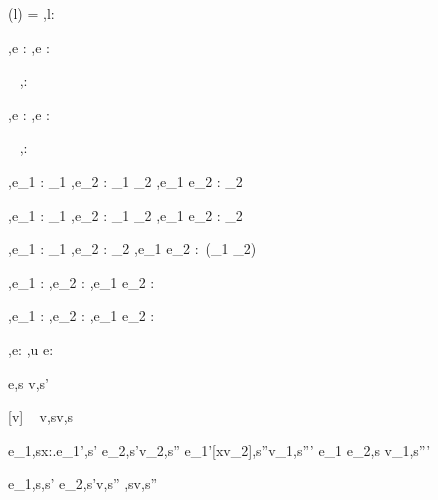  {\Sigma(l) = \tau}
  {\Gamma,\Sigma\infers l:\Reference \tau}


  {\Gamma,\Sigma \infers e : \tau}
  {\Gamma,\Sigma \infers \Edit e : \Task \tau}

  {\ }
  {\Gamma,\Sigma \infers \Enter \tau : \Task \tau}

  {\Gamma,\Sigma \infers e : \Reference \tau}
  {\Gamma,\Sigma \infers \Update e : \Task \tau}


  {\ }
  {\Gamma,\Sigma \infers \Fail : \Task \tau}


  {
    {\Gamma,\Sigma \infers e_1 : \Task \tau_1}
    {\Gamma,\Sigma \infers e_2 : \tau_1 \to \Task \tau_2}}
  {\Gamma,\Sigma \infers e_1 \Then e_2 : \Task \tau_2}


  {
    {\Gamma,\Sigma \infers e_1 : \Task \tau_1}
    {\Gamma,\Sigma \infers e_2 : \tau_1 \to \Task \tau_2}}
  {\Gamma,\Sigma \infers e_1 \Next e_2 : \Task \tau_2}


  {\Gamma,\Sigma \infers e_1 : \Task \tau_1  \Quad
   \Gamma,\Sigma \infers e_2 : \Task \tau_2}
  {\Gamma,\Sigma \infers e_1 \And e_2 : \Task\,(\tau_1 \times \tau_2)}


  {
    {\Gamma,\Sigma \infers e_1 : \Task \tau}
    {\Gamma,\Sigma \infers e_2 : \Task \tau}}
  {\Gamma,\Sigma \infers e_1 \Or e_2 : \Task \tau}


  {
    {\Gamma,\Sigma \infers e_1 : \Task \tau}
    {\Gamma,\Sigma \infers e_2 : \Task \tau}}
  {\Gamma,\Sigma \infers e_1 \Xor e_2 : \Task \tau}


  {\Gamma,\Sigma\infers e:\Task\tau}
  {\Gamma,\Sigma\infers u \At e:\Task\tau}





  {e,s \evaluate v,s'}


[v\in{}]
  {\ }
  {v,s\evaluate v,s}

  {e_1,s\evaluate \lambda x:\tau.e_1',s' \Quad
   e_2,s'\evaluate v_2,s'' \Quad
   e_1'[x\mapsto v_2],s''\evaluate v_1,s'''}
  {e_1 e_2,s \evaluate v_1,s'''}


    {e_1,s\evaluate \True,s' \Quad
     e_2,s'\evaluate v,s''}
    {,s\evaluate v,s''}

